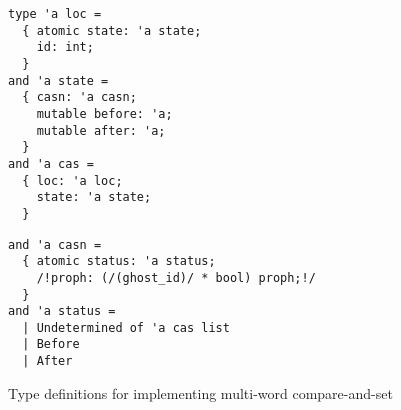 \begin{figure}[tp]
\begin{minipage}[t]{.45\textwidth}
\begin{lstlisting}
type 'a loc =
  { atomic state: 'a state;
    id: int;
  }
and 'a state =
  { casn: 'a casn;
    mutable before: 'a;
    mutable after: 'a;
  }
and 'a cas =
  { loc: 'a loc;
    state: 'a state;
  }
\end{lstlisting}
\end{minipage}
\hfill
\begin{minipage}[t]{.45\textwidth}
\begin{lstlisting}
and 'a casn =
  { atomic status: 'a status;
    /!proph: (/(ghost_id)/ * bool) proph;!/
  }
and 'a status =
  | Undetermined of 'a cas list
  | Before
  | After
\end{lstlisting}
\end{minipage}
\caption{Type definitions for implementing multi-word compare-and-set}
\label{fig:mcas}
\end{figure}
